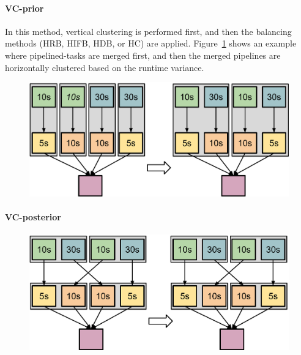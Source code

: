 \documentclass[final,5p,times,twocolumn]{elsarticle}
\begin{document}

\paragraph{\textbf{VC-prior}}
In this method, vertical clustering is performed first, and then the balancing methods (HRB, HIFB, HDB, or HC) are applied. Figure~\ref{fig:imbalance_vc_prior} shows an example where pipelined-tasks are merged first, and then the merged pipelines are horizontally clustered based on the runtime variance.

\begin{figure}[!htb]
	\centering
	\includegraphics[width=0.85\linewidth]{figure12.eps}
	\label{fig:imbalance_vc_prior}
\end{figure}

\paragraph{\textbf{VC-posterior}} 

\begin{figure}[!htb]
	\centering
	\includegraphics[width=0.85\linewidth]{figure13.eps}
	\label{fig:imbalance_vc_posterior}
\end{figure}
\end{document}
